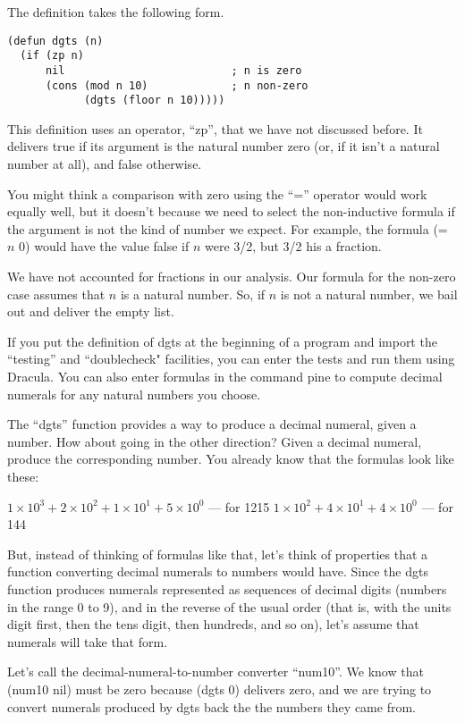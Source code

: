 The definition takes the following form.
\begin{lstlisting}
(defun dgts (n)
  (if (zp n)
      nil                          ; n is zero
      (cons (mod n 10)             ; n non-zero
            (dgts (floor n 10)))))
\end{lstlisting}

This definition uses an operator, ``zp'', that we have not discussed before.
It delivers true if its argument is the natural number zero
(or, if it isn't a natural number at all),
and false otherwise.

You might think a comparison with zero using the ``='' operator
would work equally well, but it doesn't because we need to select
the non-inductive formula if the argument is not the kind of
number we expect. For example, the formula (= $n$ 0) would have the
value false if $n$ were 3/2, but 3/2 his a fraction.

We have not accounted for fractions in our analysis.
Our formula for the non-zero case assumes that $n$ is a natural number.
So, if $n$ is not a natural number,
we bail out and deliver the empty list.

If you put the definition of dgts at the beginning of a program
and import the ``testing'' and ``doublecheck" facilities, you
can enter the tests and run them using Dracula.
You can also enter formulas in the command pine to compute
decimal numerals for any natural numbers you choose.

The ``dgts'' function provides a way to produce a decimal
numeral, given a number. How about going in the other direction?
Given a decimal numeral, produce the corresponding number.
You already know that the formulas look like these:
\begin{center}
$1 \times 10^3 + 2 \times 10^2 + 1 \times 10^1 + 5 \times 10^0$ --- for 1215
$1 \times 10^2 + 4 \times 10^1 + 4 \times 10^0$ --- for 144
\end{center}

But, instead of thinking of formulas like that, let's think of properties
that a function converting decimal numerals to numbers would have.
Since the dgts function produces numerals represented as sequences
of decimal digits (numbers in the range 0 to 9), and in the reverse
of the usual order (that is, with the units digit first, then the tens
digit, then hundreds, and so on), let's assume that numerals will
take that form.

Let's call the decimal-numeral-to-number converter ``num10''.
We know that (num10 nil) must be zero because (dgts 0) delivers
zero, and we are trying to convert numerals produced by dgts
back the the numbers they came from.

